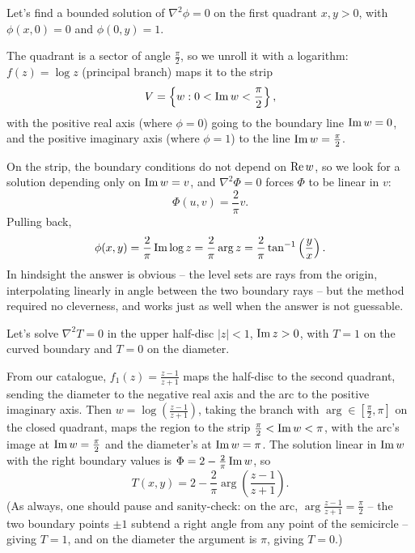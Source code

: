 \documentclass[a4paper]{scrartcl}
\begin{document}
\begin{example}
	Let's find a bounded solution of $\nabla^2 \phi = 0$ on the first quadrant $x, y > 0$, with $\phi(x, 0) = 0$ and $\phi(0, y) = 1$.

	The quadrant is a sector of angle $\frac{\pi}{2}$, so we unroll it with a logarithm: $f(z) = \log z$ (principal branch) maps it to the strip
	$$
	V = \left\{w : 0 < \operatorname{Im} w < \frac{\pi}{2}\right\},
	$$
	with the positive real axis (where $\phi = 0$) going to the boundary line $\operatorname{Im} w = 0$, and the positive imaginary axis (where $\phi = 1$) to the line $\operatorname{Im} w = \frac{\pi}{2}$.

	On the strip, the boundary conditions do not depend on $\operatorname{Re} w$, so we look for a solution depending only on $\operatorname{Im} w = v$, and $\nabla^2 \Phi = 0$ forces $\Phi$ to be linear in $v$:
	$$
	\Phi(u, v) = \frac{2}{\pi} v.
	$$
	Pulling back,
	$$
	\phi(x, y) = \frac{2}{\pi} \operatorname{Im} \log z = \frac{2}{\pi} \arg z = \frac{2}{\pi} \tan^{-1}\left(\frac{y}{x}\right).
	$$
	In hindsight the answer is obvious -- the level sets are rays from the origin, interpolating linearly in angle between the two boundary rays -- but the method required no cleverness, and works just as well when the answer is not guessable.
\end{example}

\begin{example}
	Let's solve $\nabla^2 T = 0$ in the upper half-disc $|z| < 1$, $\operatorname{Im} z > 0$, with $T = 1$ on the curved boundary and $T = 0$ on the diameter.

	From our catalogue, $f_1(z) = \frac{z-1}{z+1}$ maps the half-disc to the second quadrant, sending the diameter to the negative real axis and the arc to the positive imaginary axis. Then $w = \log\left(\frac{z-1}{z+1}\right)$, taking the branch with $\arg \in [\frac{\pi}{2}, \pi]$ on the closed quadrant, maps the region to the strip $\frac{\pi}{2} < \operatorname{Im} w < \pi$, with the arc's image at $\operatorname{Im} w = \frac{\pi}{2}$ and the diameter's at $\operatorname{Im} w = \pi$. The solution linear in $\operatorname{Im} w$ with the right boundary values is $\Phi = 2 - \frac{2}{\pi} \operatorname{Im} w$, so
	$$
	T(x, y) = 2 - \frac{2}{\pi}\arg\left(\frac{z - 1}{z + 1}\right).
	$$
	(As always, one should pause and sanity-check: on the arc, $\arg\frac{z-1}{z+1} = \frac{\pi}{2}$ -- the two boundary points $\pm 1$ subtend a right angle from any point of the semicircle -- giving $T = 1$, and on the diameter the argument is $\pi$, giving $T = 0$.)
\end{example}
\end{document}
